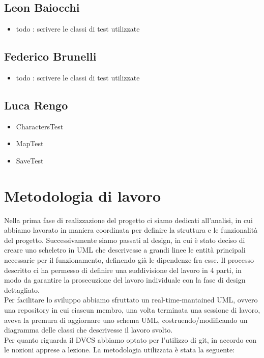 \subsection*{Leon Baiocchi}

\begin{itemize}
	\item todo : scrivere le classi di test utilizzate
\end{itemize}

\subsection*{Federico Brunelli}

\begin{itemize}
	\item todo : scrivere le classi di test utilizzate
\end{itemize}

\subsection*{Luca Rengo}

\begin{itemize}
	\item \textsf{\small CharactersTest}
	\item \textsf{\small MapTest}
	\item \textsf{\small SaveTest}
\end{itemize}



\section{Metodologia di lavoro}

Nella prima fase di realizzazione del progetto ci siamo dedicati all'analisi, in cui abbiamo lavorato in maniera coordinata per definire la struttura e le funzionalità del progetto.
Successivamente siamo passati al design, in cui è stato deciso di creare uno scheletro in UML che descrivesse a grandi linee le entità principali necessarie per il funzionamento, definendo già le dipendenze fra esse. Il processo descritto ci ha permesso di definire una suddivisione del lavoro in 4 parti, in modo da garantire la prosecuzione del lavoro individuale con la fase di design dettagliato. \\
Per facilitare lo sviluppo abbiamo sfruttato un real-time-mantained UML, ovvero una repository in cui ciascun membro, una volta terminata una sessione di lavoro, aveva la premura di aggiornare uno schema UML, costruendo/modificando un diagramma delle classi che descrivesse il lavoro svolto. \\
Per quanto riguarda il DVCS abbiamo optato per l'utilizzo di git, in accordo con le nozioni apprese a lezione. La metodologia utilizzata è stata la seguente:

